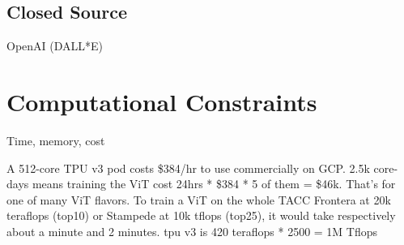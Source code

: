 \subsection{Closed Source}

OpenAI (DALL*E)

\section{Computational Constraints}

Time, memory, cost

A 512-core TPU v3 pod costs \$384/hr to use commercially on GCP. 
2.5k core-days means training the ViT cost 24hrs * \$384 * 5 of them = \$46k. 
That's for one of many ViT flavors.
To train a ViT on the whole TACC Frontera at 20k teraflops (top10) or 
Stampede at 10k tflops (top25), it would take respectively about a minute and 2 minutes.
tpu v3 is 420 teraflops * 2500 = 1M Tflops








